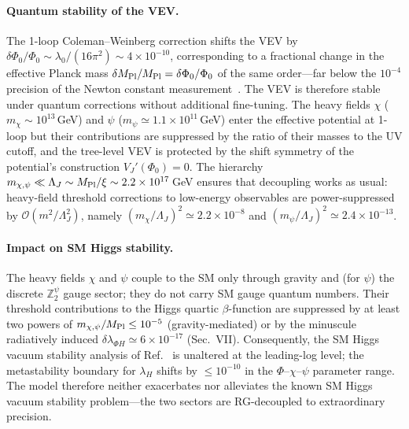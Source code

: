 \documentclass[pdflatex,sn-mathphys-num]{sn-jnl}
\newcommand{\MP}{M_{\rm Pl}}
\newcommand{\Ztwo}{\mathbb{Z}_2}
\newcommand{\Ztwopsi}{\Ztwo^{\psi}}
\newcommand{\PhiV}{\Phi_0}
\theoremstyle{thmstyleone}
\begin{document}
\paragraph{Quantum stability of the VEV.} The 1-loop Coleman--Weinberg correction shifts the VEV by $\delta\PhiV/\PhiV\sim\lambda_0/(16\pi^2)\sim4\times10^{-10}$, corresponding to a fractional change in the effective Planck mass $\delta\MP/\MP=\delta\PhiV/\PhiV$ of the same order---far below the $10^{-4}$ precision of the Newton constant measurement~\cite{CODATA2014}. The VEV is therefore stable under quantum corrections without additional fine-tuning. The heavy fields $\chi$ ($m_\chi\sim10^{13}\,$GeV) and $\psi$ ($m_\psi\simeq1.1\times10^{11}\,$GeV) enter the effective potential at 1-loop but their contributions are suppressed by the ratio of their masses to the UV cutoff, and the tree-level VEV is protected by the shift symmetry of the potential's construction $V_J'(\PhiV)=0$. The hierarchy $m_{\chi,\psi}\ll\Lambda_J\sim\MP/\xi\sim2.2\times10^{17}\,$GeV ensures that decoupling works as usual: heavy-field threshold corrections to low-energy observables are power-suppressed by $\mathcal{O}(m^2/\Lambda_J^2)$, namely $(m_\chi/\Lambda_J)^2\simeq2.2\times10^{-8}$ and $(m_\psi/\Lambda_J)^2\simeq2.4\times10^{-13}$.

\paragraph{Impact on SM Higgs stability.} The heavy fields $\chi$ and $\psi$ couple to the SM only through gravity and (for $\psi$) the discrete $\Ztwopsi$ gauge sector; they do not carry SM gauge quantum numbers. Their threshold contributions to the Higgs quartic $\beta$-function are suppressed by at least two powers of $m_{\chi,\psi}/\MP\leq10^{-5}$ (gravity-mediated) or by the minuscule radiatively induced $\delta\lambda_{\Phi H}\simeq6\times10^{-17}$ (Sec.~VII). Consequently, the SM Higgs vacuum stability analysis of Ref.~\cite{Buttazzo2013} is unaltered at the leading-log level; the metastability boundary for $\lambda_H$ shifts by $\leq10^{-10}$ in the $\Phi$--$\chi$--$\psi$ parameter range. The model therefore neither exacerbates nor alleviates the known SM Higgs vacuum stability problem---the two sectors are RG-decoupled to extraordinary precision.
\end{document}
